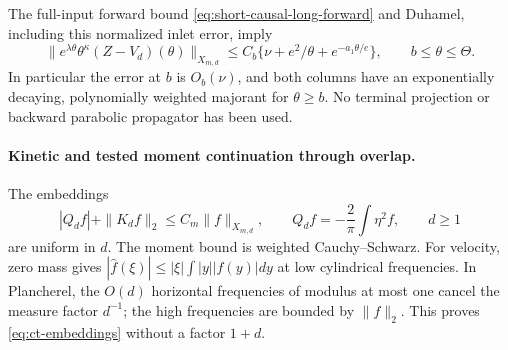 The full-input forward bound \eqref{eq:short-causal-long-forward}
and Duhamel, including this normalized inlet error, imply
\begin{equation}\label{eq:ct-long-comparison}
 \|e^{\lambda\theta}\theta^\kappa(Z-V_d)(\theta)\|_{X_{m,d}}
 \le C_b\{\nu+e^2/\theta+e^{-a_1\theta/e}\},\qquad b\le\theta\le\Theta.
\end{equation}
In particular the error at $b$ is $O_b(\nu)$, and both columns
have an exponentially decaying, polynomially weighted majorant
for $\theta\ge b$. No terminal projection or backward parabolic
propagator has been used.

\paragraph{Kinetic and tested moment continuation through overlap.}
The embeddings
\begin{equation}\label{eq:ct-embeddings}
 |Q_d f|+\|K_df\|_2\le C_m\|f\|_{X_{m,d}},\qquad
 Q_df=-\frac2\pi\int\eta^2f,\qquad d\ge1
\end{equation}
are uniform in $d$. The moment bound is weighted Cauchy--Schwarz.
For velocity, zero mass gives
$|\widehat f(\xi)|\le|\xi|\int|y||f(y)|dy$ at low cylindrical
frequencies. In Plancherel, the $O(d)$ horizontal frequencies
of modulus at most one cancel the measure factor $d^{-1}$;
the high frequencies are bounded by $\|f\|_2$. This proves
\eqref{eq:ct-embeddings} without a factor $1+d$.

